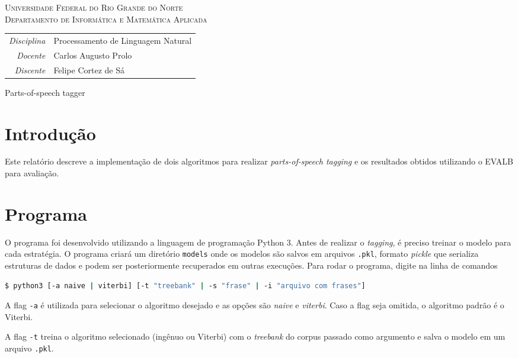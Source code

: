 \documentclass[12pt, a4paper]{article}
\newcommand{\code}[1]{{\lstinline{#1}}}
\begin{document}
\begin{center}
    \textsc{Universidade Federal do Rio Grande do Norte} \\
    \textsc{Departamento de Informática e Matemática Aplicada}
\end{center}

\bigskip

\begin{tabular}{@{}rl@{}}
    \emph{Disciplina} & Processamento de Linguagem Natural \\
    \emph{Docente}    & Carlos Augusto Prolo \\
    \emph{Discente}   & Felipe Cortez de Sá \\
\end{tabular}

\bigskip

\begin{center}
\large Parts-of-speech tagger
\end{center}

\section{Introdução}
Este relatório descreve a implementação de dois algoritmos para realizar
\emph{parts-of-speech tagging} e os resultados obtidos utilizando o EVALB para
avaliação. 

\section{Programa}
O programa foi desenvolvido utilizando a linguagem de programação Python 3.
Antes de realizar o \emph{tagging}, é preciso treinar o modelo para cada
estratégia. O programa criará um diretório \code{models} onde os modelos são
salvos em arquivos \code{.pkl}, formato \emph{pickle} que serializa estruturas
de dados e podem ser posteriormente recuperados em outras execuções. Para rodar
o programa, digite na linha de comandos

\begin{lstlisting}[language=bash]
$ python3 [-a naive | viterbi] [-t "treebank" | -s "frase" | -i "arquivo com frases"]
\end{lstlisting}

A flag \code{-a} é utilizada para selecionar o algoritmo desejado e as opções
são \emph{naive} e \emph{viterbi}. Caso a flag seja omitida, o algoritmo
padrão é o Viterbi.

A flag \code{-t} treina o algoritmo selecionado (ingênuo ou Viterbi) com o
\emph{treebank} do corpus passado como argumento e salva o modelo em um arquivo \code{.pkl}.
\end{document}
